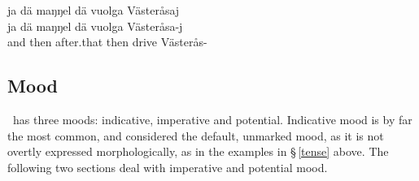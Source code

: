 \z
\ea\label{presentEx3}%
\glll	ja dä maŋŋel dä vuolga Västeråsaj\\
	ja dä maŋŋel dä vuolga Västeråsa-j\\
	and then after.that then drive\BS{} Västerås-\\\nopagebreak
{}	
\z
{}


\subsection{Mood}\label{mood}
\PS\ has three moods: indicative, imperative and potential. Indicative mood is by far the most common, and considered the default, unmarked mood, as it is not overtly expressed morphologically, as in the examples in §\,\ref{tense} above. 
The following two sections deal with imperative and potential mood. %

